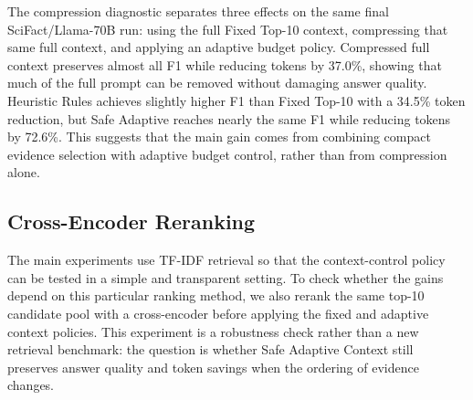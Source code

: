 \documentclass[11pt]{article}
\begin{document}
\begin{table}[t]
\centering
\small
\caption{Compression and budget diagnostic on Llama-70B.}
\label{tab:table_4_compression_and_budget_diagnosti}
\end{table}

The compression diagnostic separates three effects on the same final SciFact/Llama-70B run: using the full Fixed Top-10 context, compressing that same full context, and applying an adaptive budget policy. Compressed full context preserves almost all F1 while reducing tokens by 37.0\%, showing that much of the full prompt can be removed without damaging answer quality. Heuristic Rules achieves slightly higher F1 than Fixed Top-10 with a 34.5\% token reduction, but Safe Adaptive reaches nearly the same F1 while reducing tokens by 72.6\%. This suggests that the main gain comes from combining compact evidence selection with adaptive budget control, rather than from compression alone.


\subsection{Cross-Encoder Reranking}

The main experiments use TF-IDF retrieval so that the context-control policy can be tested in a simple and transparent setting. To check whether the gains depend on this particular ranking method, we also rerank the same top-10 candidate pool with a cross-encoder before applying the fixed and adaptive context policies. This experiment is a robustness check rather than a new retrieval benchmark: the question is whether Safe Adaptive Context still preserves answer quality and token savings when the ordering of evidence changes.
\end{document}
